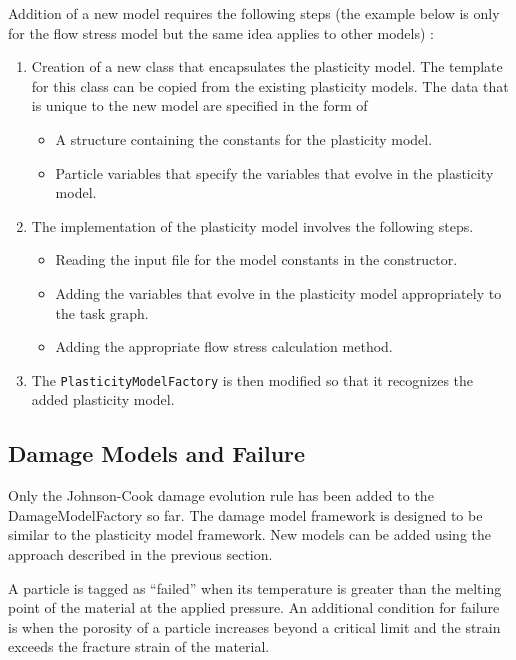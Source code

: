Addition of a new model requires the following steps (the example below is only
for the flow stress model but the same idea applies to other models) :
\begin{enumerate}
    \item Creation of a new class that encapsulates the plasticity 
    model.  The template for this class can be copied from the
    existing plasticity models.  The data that is unique to 
    the new model are specified in the form of 
    \begin{itemize}
      \item A structure containing the constants for the plasticity
            model.
      \item Particle variables that specify the variables that 
            evolve in the plasticity model.
    \end{itemize}
    \item The implementation of the plasticity model involves the
    following steps.
    \begin{itemize}
      \item Reading the input file for the model constants in the
            constructor.
      \item Adding the variables that evolve in the plasticity model
            appropriately to the task graph.
      \item Adding the appropriate flow stress calculation method.
    \end{itemize}
    \item The \verb+PlasticityModelFactory+ is then modified so that
          it recognizes the added plasticity model.
\end{enumerate}

\subsection{Damage Models and Failure}
Only the Johnson-Cook damage evolution rule has been added to the 
DamageModelFactory so far.  The damage model framework is designed 
to be similar to the plasticity model framework.  New models can
be added using the approach described in the previous section.

  A particle is tagged as ``failed'' when its temperature is greater than the
  melting point of the material at the applied pressure.  An additional
  condition for failure is when the porosity of a particle increases beyond a
  critical limit and the strain exceeds the fracture strain of the material.  

